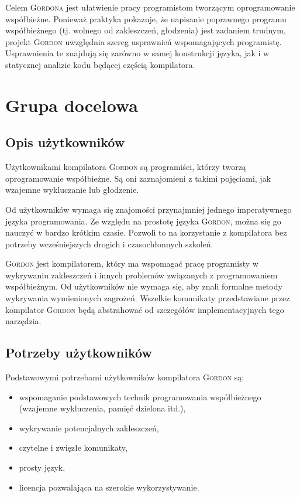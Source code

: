 \documentclass{documentation}
\begin{document}
Celem \textsc{Gordona} jest ułatwienie pracy programistom tworzącym
oprogramowanie współbieżne. Ponieważ praktyka pokazuje, że napisanie poprawnego
programu współbieżnego (tj. wolnego od zakleszczeń, głodzenia) jest zadaniem
trudnym, projekt \textsc{Gordon} uwzględnia szereg usprawnień wspomagających
programistę. Usprawnienia te znajdują się zarówno w samej konstrukcji języka,
jak i w statycznej analizie kodu będącej częścią kompilatora.

\section{Grupa docelowa}
\subsection{Opis użytkowników}
\noindent Użytkownikami kompilatora \textsc{Gordon} są programiści, którzy
tworzą oprogramowanie współbieżne. Są oni zaznajomieni z takimi pojęciami, jak
wzajemne wykluczanie lub głodzenie.

Od użytkowników wymaga się znajomości przynajmniej jednego imperatywnego języka programowania. Ze względu na prostotę języka \textsc{Gordon}, można się go nauczyć w bardzo krótkim czasie. Pozwoli to na korzystanie z kompilatora bez potrzeby wcześniejszych drogich i czasochłonnych szkoleń.

\textsc{Gordon} jest kompilatorem, który ma wspomagać pracę programisty w wykrywaniu zakleszczeń i innych problemów związanych z programowaniem współbieżnym. Od użytkowników nie wymaga się, aby znali formalne metody wykrywania wymienionych zagrożeń. Wszelkie komunikaty przedstawiane przez kompilator \textsc{Gordon} będą abstrahować od szczegółów implementacyjnych tego narzędzia.

\subsection{Potrzeby użytkowników}
\noindent Podstawowymi potrzebami użytkowników kompilatora \textsc{Gordon} są:
\begin{itemize}
\item wspomaganie podstawowych technik programowania współbieżnego (wzajemne wykluczenia, pamięć dzielona itd.),
\item wykrywanie potencjalnych zakleszczeń,
\item czytelne i zwięzłe komunikaty,
\item prosty język,
\item licencja pozwalająca na szerokie wykorzystywanie.
\end{itemize}
\end{document}
